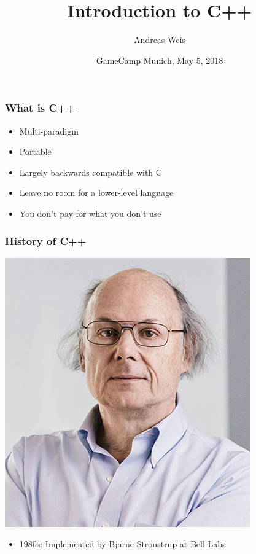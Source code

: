 \documentclass[aspectratio=43]{beamer}
\title{Introduction to C++}
\author{Andreas Weis}
\date{GameCamp Munich, May 5, 2018}
\begin{document}
\frame{\titlepage}


\begin{frame}
  \frametitle{What is C++}
  \pause
  \begin{itemize}[<+->]
  \item Multi-paradigm
  \item Portable
  \item Largely backwards compatible with C
  \item Leave no room for a lower-level language
  \item You don't pay for what you don't use
  \end{itemize}
\end{frame}


\begin{frame}
  \frametitle{History of C++}
  \includegraphics[height=.25\textheight]{resources/bjarne.jpg} 
  \begin{itemize}[<+->]
  \item 1980s: Implemented by Bjarne Stroustrup at Bell Labs

\end{itemize}
\end{frame}
\end{document}
